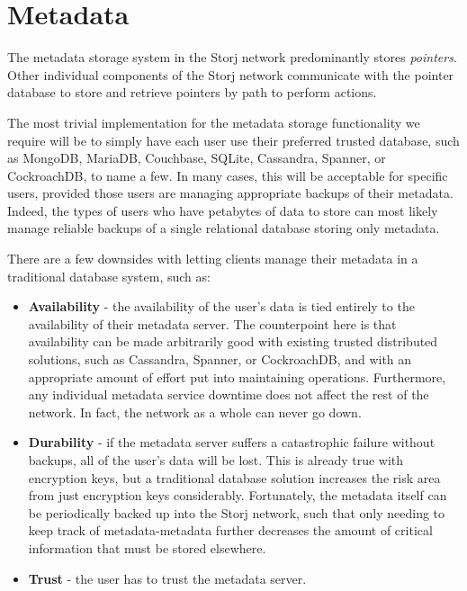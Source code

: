 \documentclass[11pt,fleqn,openany]{book}
\begin{document}
\section{Metadata}\label{sec:concrete-metadata}

The metadata storage system in the Storj network predominantly stores
{\em pointers}. Other individual components of the Storj network communicate with
the pointer database to store and retrieve pointers by path to perform actions.

The most trivial implementation for the metadata storage functionality we
require will be to simply have each user use their preferred trusted database,
such as MongoDB, MariaDB, Couchbase, SQLite, Cassandra\cite{cassandra},
Spanner\cite{spanner}, or CockroachDB, to name a few. In many cases, this will
be acceptable for specific users, provided those users are managing appropriate
backups of their metadata. Indeed, the types of users who have petabytes of data
to store can most likely manage reliable backups of a single relational database
storing only metadata.

There are a few downsides with letting clients manage their metadata in a
traditional database system, such as:
\begin{itemize}
\item {\bf Availability} - the availability of the user's data
is tied entirely to the availability of their metadata server. The counterpoint
here is that availability can be made arbitrarily good with existing trusted
distributed solutions, such as Cassandra, Spanner, or CockroachDB, and with an
appropriate amount of effort put into maintaining operations. Furthermore, any
individual metadata service downtime does not affect the rest of the network. In
fact, the network as a whole can never go down.
\item {\bf Durability} -
if the metadata server suffers a catastrophic failure without backups, all of
the user's data will be lost. This is already true with encryption keys,
but a traditional database solution increases the risk area from just encryption
keys considerably. Fortunately, the metadata itself can be periodically backed
up into the Storj network,
such that only needing to keep track of metadata-metadata
further decreases the amount of critical information that must be stored
elsewhere.
\item {\bf Trust} - the user has to trust the metadata server.
\end{itemize}
\end{document}
